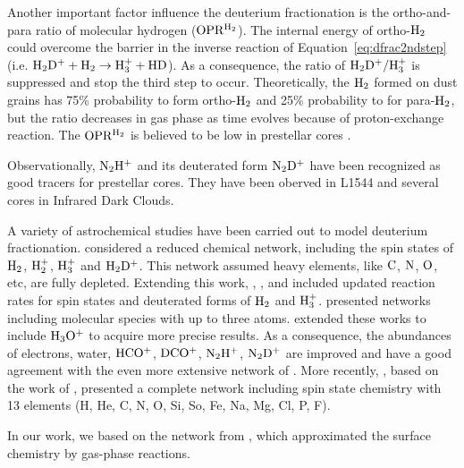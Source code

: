 Another important factor influence the deuterium fractionation is the ortho-and-para ratio of molecular hydrogen ($\rm OPR^{H_2}$). The internal energy of ortho-$\rm H_2$ could overcome the barrier in the inverse reaction of Equation~\ref{eq:dfrac2ndstep} (i.e. $\rm H_2D^+ + H_2 \rightarrow H_3^+ + HD$). As a consequence, the ratio of $\rm H_2D^+/H_3^+$ is suppressed and stop the third step to occur. Theoretically, the $\rm H_2$ formed on dust grains has 75\% probability to form ortho-$\rm H_2$ and 25\% probability to for para-$\rm H_2$, but the ratio decreases in gas phase as time evolves because of proton-exchange reaction. The $\rm OPR^{H_2}$ is believed to be low in prestellar cores \cite{Sipila2013,Brunken2014}.



Observationally, $\rm N_2H^+$ and its deuterated form $\rm N_2D^+$ have been recognized as good tracers for prestellar cores. They have been oberved in L1544 and several cores in Infrared Dark Clouds.

A variety of astrochemical studies have been carried out to model deuterium fractionation. \cite{Walmsley2004} considered a reduced chemical network, including the spin states of $\rm H_2$, $\rm H_2^+$, $\rm H_3^+$ and $\rm H_2D^+$. This network assumed heavy elements, like $\rm C$, $\rm N$, $\rm O$, etc, are fully depleted. Extending this work, \cite{Flower2006}, \cite{Hugo2009}, \cite{Pagani2009} and \cite{Sipila2010} included updated reaction rates for spin states and deuterated forms of $\rm H_2$ and $\rm H_3^+$. \cite{Vastel2012} presented networks including molecular species with up to three atoms. \cite{Kong2015a} extended these works to include $\rm H_3O^+$ to acquire more precise results. As a consequence, the abundances of electrons, water, $\rm HCO^+$, $\rm DCO^+$, $\rm N_2H^+$, $\rm N_2D^+$ are improved and have a good agreement with the even more extensive network of \cite{Sipila2013}. More recently, \cite{Majumdar2016a}, based on the work of \cite{Wakelam2015}, presented a complete network including spin state chemistry with 13 elements (H, He, C, N, O, Si, So, Fe, Na, Mg, Cl, P, F).

In our work, we based on the network from \cite{Kong2015a}, which approximated the surface chemistry by gas-phase reactions.

